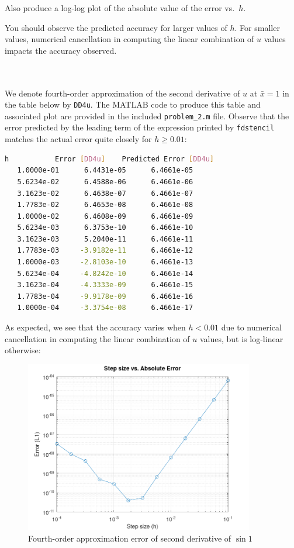   Also produce a log-log plot of the absolute value of the error vs.~$h$.  

  You should observe the predicted accuracy for larger values of $h$. For smaller values, numerical cancellation in 
  computing the linear combination of $u$ values impacts the accuracy observed.
    
\begin{solution}\ \\\\
    We denote fourth-order approximation of the second derivative of $u$ at $\bar{x} = 1$ in the table below by
    \texttt{DD4u}. The MATLAB code to produce this table and associated plot are provided in the included 
    \verb|problem_2.m| file. Observe that the error predicted by the leading term of the expression printed by 
    \texttt{fdstencil} matches the actual error quite closely for $h \ge 0.01$: \\

    \begin{lstlisting}[language=bash]
       h           Error [DD4u]    Predicted Error [DD4u]
   1.0000e-01      6.4431e-05      6.4661e-05
   5.6234e-02      6.4588e-06      6.4661e-06
   3.1623e-02      6.4638e-07      6.4661e-07
   1.7783e-02      6.4653e-08      6.4661e-08
   1.0000e-02      6.4608e-09      6.4661e-09
   5.6234e-03      6.3753e-10      6.4661e-10
   3.1623e-03      5.2040e-11      6.4661e-11
   1.7783e-03     -3.9182e-11      6.4661e-12
   1.0000e-03     -2.8103e-10      6.4661e-13
   5.6234e-04     -4.8242e-10      6.4661e-14
   3.1623e-04     -4.3333e-09      6.4661e-15
   1.7783e-04     -9.9178e-09      6.4661e-16
   1.0000e-04     -3.3754e-08      6.4661e-17
    \end{lstlisting}

    \pagebreak

    As expected, we see that the accuracy varies when $h < 0.01$ due to numerical cancellation in computing the linear
    combination of $u$ values, but is log-linear otherwise:

    \begin{figure}[h]
        \includegraphics[width=10cm]{fourth-order-uxx-error.png}
        \centering
        \caption{Fourth-order approximation error of second derivative of $\sin{1}$}
    \end{figure}
\end{solution}